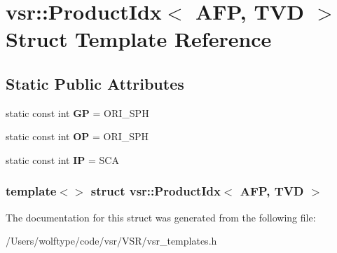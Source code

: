 \hypertarget{structvsr_1_1_product_idx_3_01_a_f_p_00_01_t_v_d_01_4}{\section{vsr\-:\-:Product\-Idx$<$ A\-F\-P, T\-V\-D $>$ Struct Template Reference}
\label{structvsr_1_1_product_idx_3_01_a_f_p_00_01_t_v_d_01_4}
}
\subsection*{Static Public Attributes}
\begin{DoxyCompactItemize}
\item 
\hypertarget{structvsr_1_1_product_idx_3_01_a_f_p_00_01_t_v_d_01_4_a4fd849a47a7c85abfcbf94bacff87ccd}{static const int {\bfseries G\-P} = O\-R\-I\-\_\-\-S\-P\-H}\label{structvsr_1_1_product_idx_3_01_a_f_p_00_01_t_v_d_01_4_a4fd849a47a7c85abfcbf94bacff87ccd}

\item 
\hypertarget{structvsr_1_1_product_idx_3_01_a_f_p_00_01_t_v_d_01_4_a54ff85a783bb182628f87a9d9b58b97a}{static const int {\bfseries O\-P} = O\-R\-I\-\_\-\-S\-P\-H}\label{structvsr_1_1_product_idx_3_01_a_f_p_00_01_t_v_d_01_4_a54ff85a783bb182628f87a9d9b58b97a}

\item 
\hypertarget{structvsr_1_1_product_idx_3_01_a_f_p_00_01_t_v_d_01_4_a510c35f85a16de85c26ed71c3fe6ccf0}{static const int {\bfseries I\-P} = S\-C\-A}\label{structvsr_1_1_product_idx_3_01_a_f_p_00_01_t_v_d_01_4_a510c35f85a16de85c26ed71c3fe6ccf0}

\end{DoxyCompactItemize}
\subsubsection*{template$<$$>$ struct vsr\-::\-Product\-Idx$<$ A\-F\-P, T\-V\-D $>$}



The documentation for this struct was generated from the following file\-:\begin{DoxyCompactItemize}
\item 
/\-Users/wolftype/code/vsr/\-V\-S\-R/vsr\-\_\-templates.\-h\end{DoxyCompactItemize}
